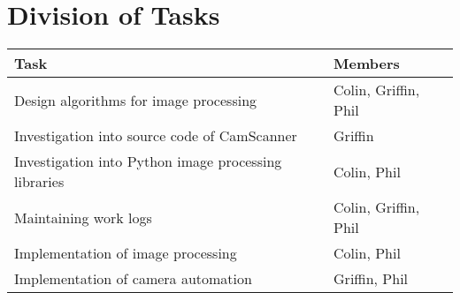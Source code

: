 \documentclass[]{article}
\begin{document}
	\section{Division of Tasks}
		
		\begin{tabular}{| l | l |}
			\hline
			Task 	&	Members\\
			\hline
			\hline
			Design algorithms for image processing	&	Colin, Griffin, Phil\\
			\hline
			Investigation into source code of CamScanner	&	Griffin\\
			\hline
			Investigation into Python image processing libraries &	Colin, Phil\\
			\hline
			Maintaining work logs	&	Colin, Griffin, Phil\\
			\hline
			Implementation of image processing &	Colin, Phil\\
			\hline
			Implementation of camera automation &	Griffin, Phil\\
			\hline
			
			
		\end{tabular}
	
		
	
\end{document}
